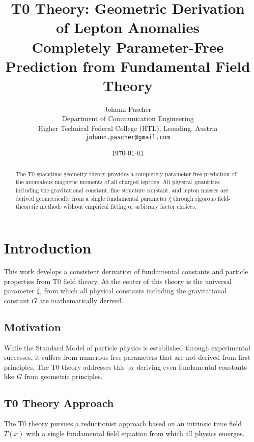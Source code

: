 \documentclass[12pt,a4paper]{article}
\newcommand{\xipar}{\xi}
\begin{document}
	
	\title{T0 Theory: Geometric Derivation of Lepton Anomalies \\
		\large Completely Parameter-Free Prediction from Fundamental Field Theory}
	\author{Johann Pascher\\
		Department of Communication Engineering\\
		Higher Technical Federal College (HTL), Leonding, Austria\\
		\texttt{johann.pascher@gmail.com}}
	\date{\today}
	
	\maketitle
	
	\begin{abstract}
		The T0 spacetime geometry theory provides a completely parameter-free prediction of the anomalous magnetic moments of all charged leptons. All physical quantities including the gravitational constant, fine structure constant, and lepton masses are derived geometrically from a single fundamental parameter $\xipar$ through rigorous field-theoretic methods without empirical fitting or arbitrary factor choices.
	\end{abstract}
	
	\tableofcontents
	\newpage
	
	\section{Introduction}
	
	This work develops a consistent derivation of fundamental constants and particle properties from T0 field theory. At the center of this theory is the universal parameter $\xi$, from which all physical constants including the gravitational constant $G$ are mathematically derived.
	
	\subsection{Motivation}
	While the Standard Model of particle physics is established through experimental successes, it suffers from numerous free parameters that are not derived from first principles. The T0 theory addresses this by deriving even fundamental constants like $G$ from geometric principles.
	
	\subsection{T0 Theory Approach}
	The T0 theory pursues a reductionist approach based on an intrinsic time field $T(x)$ with a single fundamental field equation from which all physics emerges.
	
\end{document}
